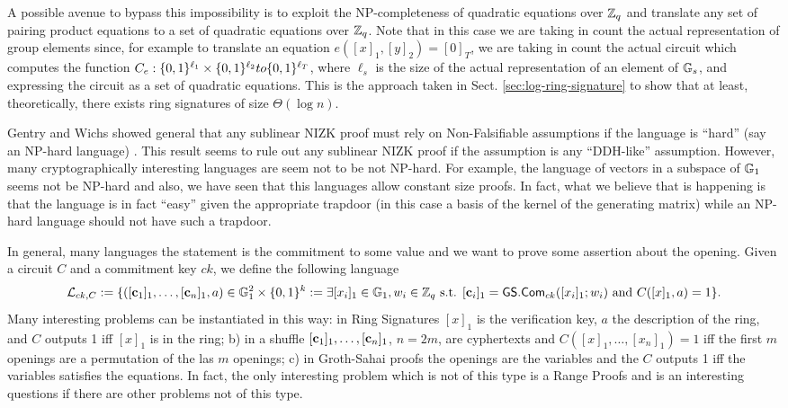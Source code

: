 A possible avenue to bypass this impossibility is to exploit the NP-completeness of quadratic equations over $\mathbb{Z}_q$ and translate any set of pairing product equations to a set of quadratic equations over $\mathbb{Z}_q$. Note that in this case we are taking in count the actual representation of group elements since, for example to translate an equation $e([x]_1,[y]_2)=[0]_T$, we are taking in count the actual circuit which computes the function $C_e:\{0,1\}^{\ell_1}\times \{0,1\}^{\ell_2} to\{0,1\}^{\ell_T}$, where $\ell_s$ is the size of the actual representation of an element of $\mathbb{G}_s$, and expressing the circuit as a set of quadratic equations. This is the approach taken in Sect. \ref{sec:log-ring-signature} to show that at least, theoretically, there exists ring signatures of size $\Theta(\log n)$.

Gentry and Wichs showed general that any sublinear NIZK proof must rely on Non-Falsifiable assumptions if the language is ``hard'' (say an NP-hard language) \cite{STOC:GenWic}. This result seems to rule out any sublinear NIZK proof if the assumption is any ``DDH-like'' assumption. However, many cryptographically interesting languages are seem not to be not NP-hard. For example, the language of vectors in a subspace of $\mathbb{G}_1$ seems not be NP-hard and also, we have seen that this languages allow constant size proofs. In fact, what we believe that is happening is that the language is in fact ``easy'' given the appropriate trapdoor (in this case a basis of the kernel of the generating matrix) while an NP-hard language should not have such a trapdoor.

In general, many languages the statement is the commitment to some value and we want to prove some assertion about the opening. Given a circuit $C$ and a commitment key $ck$, we define the following language
$$
\mathcal{L}_{ck,C}:= \{([\mathbf{c}_1]_1,\ldots,[\mathbf{c}_n]_1,a)\in\mathbb{G}_1^2\times\{0,1\}^k:= \exists [x_i]_1\in\mathbb{G}_1,w_i\in\mathbb{Z}_q \text{ s.t. } [\mathbf{c}_i]_1={\mathsf{GS}}.\mathsf{Com}_{ck}([x_i]_1;w_i)\text{ and }C([x]_1,a)=1\}.
$$
Many interesting problems can be instantiated in this way: in Ring Signatures $[x]_1$ is the verification key, $a$ the description of the ring, and $C$ outputs 1 iff $[x]_1$ is in the ring; b) in a shuffle $[\mathbf{c}_1]_1,\ldots,[\mathbf{c}_n]_1$, $n=2m$, are cyphertexts and $C([x]_1,\ldots,[x_n]_1)=1$ iff the first $m$ openings are a permutation of the las $m$ openings; c) in Groth-Sahai proofs the openings are the variables and the $C$ outputs 1 iff the variables satisfies the equations. In fact, the only interesting problem which is not of this type is a Range Proofs and is an interesting questions if there are other problems not of this type.

